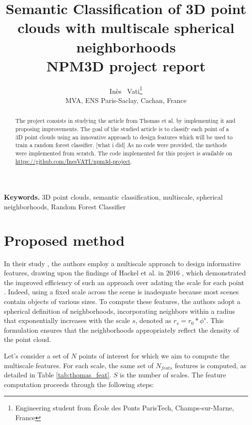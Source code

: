 \documentclass{article}
\title{Semantic Classification of 3D point clouds with multiscale spherical neighborhoods \\ \vspace{.3cm}
\small{NPM3D project report}
}
\author{%
  Inès ~Vati\thanks{Engineering student from École des Ponts ParisTech, Champs-sur-Marne, France} \\
  MVA, ENS Paris-Saclay, Cachan, France\\
  \texttt{\email{ines.vati@eleves.enpc.fr}}
}
\date{}
\begin{document}
\maketitle

\begin{abstract}
    The project consists in studying the article from Thomas et al. \cite{thomas_semantic_2018} by implementing it and proposing improvements. The goal of the studied article is to classify each point of a 3D point clouds using an innovative approach to design features which will be used to train a random forest classifier. 
    [what i did]
    As no code were provided, the methods were implemented from scratch. The code implemented for this project is available on \url{https://github.com/InesVATI/npm3d-project}. 
\end{abstract}
\textbf{Keywords.} 3D point clouds, semantic classification, multiscale, spherical neighborhoods, Random Forest Classifier



\section{Proposed method}

In their study \cite{thomas_semantic_2018}, the authors employ a multiscale approach to design informative features, drawing upon the findings of Hackel et al. in 2016 \cite{hackel_fast_nodate}, which demonstrated the improved efficiency of such an approach over adating the scale for each point \cite{weinmann_semantic_2015}. Indeed, using a fixed scale across the scene is inadequate because most scenes contain objects of various sizes. To compute these features, the authors adopt a spherical definition of neighborhoods, incorporating neighbors within a radius that exponentially increases with the scale $s$, denoted as $r_s = r_0 * \phi^s$. This formulation ensures that the neighborhoods appropriately reflect the density of the point cloud. 

Let's consider a set of $N$ points of interest for which we aim to compute the multiscale features. For each scale, the same set of $N_{feats}$ features is computed, as detailed in Table \ref{tab:thomas_feat}. $S$ is the number of scales. The feature computation proceeds through the following steps:
\end{document}
